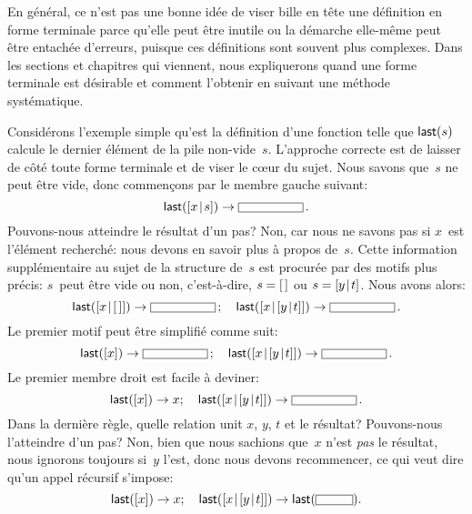 En général, ce n'est pas une bonne idée de viser bille en tête une
définition en forme terminale parce qu'elle peut être inutile ou la
démarche elle-même peut être entachée d'erreurs, puisque ces
définitions sont souvent plus complexes. Dans les sections et
chapitres qui viennent, nous expliquerons quand une forme terminale
est désirable et comment l'obtenir en suivant une méthode
systématique.

Considérons l'exemple simple qu'est la définition d'une fonction
 telle que \(\textsf{last}(s)\) calcule le dernier élément de
la pile non-vide~\(s\). L'approche correcte est de laisser de côté
toute forme terminale et de viser le c{\oe}ur du sujet. Nous savons
que~\(s\) ne peut être vide, donc commençons par le membre gauche suivant:
\begin{equation*}
\fun{last}(\cons{x}{s}) \rightarrow \fbcode{CCCCCCC}\,.
\end{equation*}
Pouvons-nous atteindre le résultat d'un pas? Non, car nous ne savons
pas si \(x\)~est l'élément recherché: nous devons en savoir plus à
propos de~\(s\). Cette information supplémentaire au sujet de la
structure de~\(s\) est procurée par des motifs plus précis: \(s\)~peut
être vide ou non, c'est-à-dire, \(s = [\,]\) ou \(s=[{y}\!\mid\!{t}]\). Nous
avons alors:
\begin{equation*}
\fun{last}(\cons{x}{\el}) \rightarrow \fbcode{CCCCCCC}\,;\quad
\fun{last}(\cons{x}{\cons{y}{t}}) \rightarrow \fbcode{CCCCCCC}\,.
\end{equation*}
Le premier motif peut être simplifié comme suit:
\begin{equation*}
\fun{last}([x]) \rightarrow \fbcode{CCCCCCC}\,;\quad
\fun{last}(\cons{x}{\cons{y}{t}}) \rightarrow \fbcode{CCCCCCC}\,.
\end{equation*}
Le premier membre droit est facile à deviner:
\begin{equation*}
\fun{last}([x]) \rightarrow x;\quad
\fun{last}(\cons{x}{\cons{y}{t}}) \rightarrow \fbcode{CCCCCCC}\,.
\end{equation*}
Dans la dernière règle, quelle relation unit \(x\), \(y\), \(t\) et le
résultat? Pouvons-nous l'atteindre d'un pas? Non, bien que nous
sachions que~\(x\) n'est \emph{pas} le résultat, nous ignorons
toujours si~\(y\) l'est, donc nous devons recommencer, ce qui veut
dire qu'un appel récursif s'impose:
\begin{equation*}
\fun{last}([x]) \rightarrow x;\quad
\fun{last}(\cons{x}{\cons{y}{t}}) \rightarrow
  \fun{last}(\fbcode{CCCC}).
\end{equation*}
